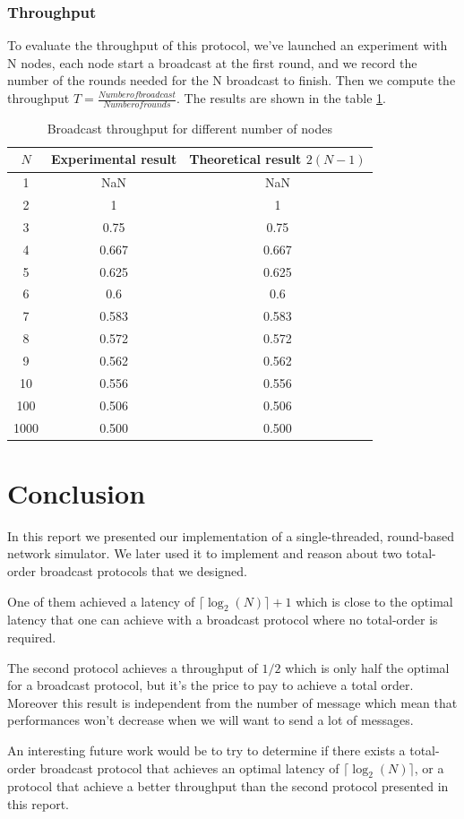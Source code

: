 \documentclass[a4paper]{article}
\begin{document}
 \subsubsection*{Throughput}
To evaluate the throughput of this protocol, we've launched an experiment with N
nodes, each node start a broadcast at the first round, and we record the number
of the rounds needed for the N broadcast to finish. Then we compute the
throughput $T=\frac{Number of broadcast}{Number of rounds}$. The results are
shown in the table \ref{table:thT}.
\begin{table}[H]
\centering
\begin{tabular}{|c|c|c|}
    \hline
    $N$  & Experimental result & Theoretical result $2(N-1)$ \\
    \hline
    1     & NaN    & NaN    \\
    2     & 1      & 1      \\
    3     & 0.75   &  0.75  \\
    4     & 0.667  & 0.667  \\
    5     & 0.625  & 0.625  \\
    6     & 0.6    &   0.6  \\
    7     & 0.583  & 0.583  \\
    8     & 0.572  & 0.572  \\
    9     & 0.562  & 0.562  \\
    10    & 0.556  & 0.556  \\
    100   & 0.506  & 0.506  \\
    1000  & 0.500  & 0.500  \\
    \hline
\end{tabular}
\caption{Broadcast throughput for different number of nodes}
\label{table:thT}
\end{table}

\section*{Conclusion}
In this report we presented our implementation of a single-threaded,
round-based network simulator. We later used it to implement and reason about
two total-order broadcast protocols that we designed.

One of them achieved a latency of $\lceil\log_2(N)\rceil + 1$ which is close
to the optimal latency that one can achieve with a broadcast protocol where no
total-order is required.

The second protocol achieves a throughput of $1/2$ which is only half the
optimal for a broadcast protocol, but it's the price to pay to achieve a total
order. Moreover this result is independent from the number of message which mean
that performances won't decrease when we will want to send a lot of messages.

An interesting future work would be to try to determine if there exists a
total-order broadcast protocol that achieves an optimal latency of
$\lceil\log_2(N)\rceil$, or a protocol that achieve a better throughput than
the second protocol presented in this report.
\end{document}

